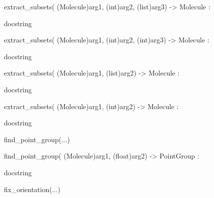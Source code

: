 \documentclass[letterpaper,10pt,english]{sphinxmanual}
\begin{document}
\begin{description}
\begin{description}
\begin{DUlineblock}{0em}
\begin{DUlineblock}{\DUlineblockindent}
\begin{DUlineblock}{\DUlineblockindent}
\item[] 
\end{DUlineblock}
\item[] extract\_subsets( (Molecule)arg1, (int)arg2, (list)arg3) -\textgreater{} Molecule :
\item[]
\begin{DUlineblock}{\DUlineblockindent}
\item[] docstring
\item[] 
\end{DUlineblock}
\item[] extract\_subsets( (Molecule)arg1, (int)arg2, (int)arg3) -\textgreater{} Molecule :
\item[]
\begin{DUlineblock}{\DUlineblockindent}
\item[] docstring
\item[] 
\end{DUlineblock}
\item[] extract\_subsets( (Molecule)arg1, (list)arg2) -\textgreater{} Molecule :
\item[]
\begin{DUlineblock}{\DUlineblockindent}
\item[] docstring
\item[] 
\end{DUlineblock}
\item[] extract\_subsets( (Molecule)arg1, (int)arg2) -\textgreater{} Molecule :
\item[]
\begin{DUlineblock}{\DUlineblockindent}
\item[] docstring
\item[] 
\end{DUlineblock}
\end{DUlineblock}
\item[] find\_point\_group(...)
\item[]
\begin{DUlineblock}{\DUlineblockindent}
\item[] find\_point\_group( (Molecule)arg1, (float)arg2) -\textgreater{} PointGroup :
\item[]
\begin{DUlineblock}{\DUlineblockindent}
\item[] docstring
\item[] 
\end{DUlineblock}
\end{DUlineblock}
\item[] fix\_orientation(...)
\item[]

\end{DUlineblock}
\end{description}
\end{description}
\end{document}
